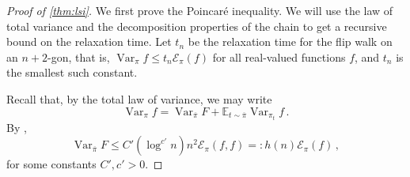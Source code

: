 \documentclass[a4paper, 12p]{article}
\numberwithin{equation}{section}
\newcommand{\Exp}{\mathbb{E}}
\newcommand{\FF}{F}
\newcommand{\piproj}{\overline{\pi}}
\newcommand{\var}{\operatorname{Var}}
\newcommand{\dir}{\mathcal{E}}
\begin{document}
\begin{proof}[Proof of \cref{thm:lsi}]
We first prove the Poincar\'e inequality. We will use the law of total variance and the decomposition properties of the chain to get a recursive bound on the relaxation time. Let $t_n$ be the relaxation time for the flip walk on an $n+2$-gon, that is, $\var_\pi f\leq t_n\dir_\pi(f)$ for all real-valued functions $f$, and $t_n$ is the smallest such constant. 

Recall that, by the total law of variance, we may write
\begin{equation}\label{eqn:vardecomp_proof}
    \var_{\pi} f = \var_{\piproj} \FF + \Exp_{t \sim \piproj} \var_{\pi_t} f\,.
\end{equation}
By ,
\begin{equation}\label{eqn:varterm}
    \var_{\piproj} \FF \leq C'(\log^{c'}n)n^{2} \dir_{\pi}(f, f)=:h(n)\dir_\pi(f) \,,
\end{equation}
for some constants $C',c'>0$.


\end{proof}
\end{document}
